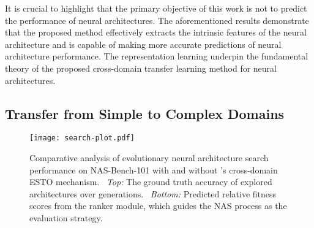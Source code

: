 \documentclass[../main.tex]{subfiles}
\begin{document}
It is crucial to highlight that the primary objective of this work is not to predict the performance of neural architectures. The aforementioned results demonstrate that the proposed method effectively extracts the intrinsic features of the neural architecture and is capable of making more accurate predictions of neural architecture performance. The representation learning underpin the fundamental theory of the proposed cross-domain transfer learning method for neural architectures.

\subsection{Transfer from Simple to Complex Domains}

\begin{figure}[t]
  \centering
  \texttt{[image: search-plot.pdf]}
  \caption{
    Comparative analysis of evolutionary neural architecture search performance on NAS-Bench-101 with and without \OUR{}'s cross-domain ESTO mechanism.
    \ \textit{Top:} The ground truth accuracy of explored architectures over generations.
    \ \textit{Bottom:} Predicted relative fitness scores from the ranker module, which guides the NAS process as the evaluation strategy.
  }\label{fig:search-process-plot}
\end{figure}
\end{document}
